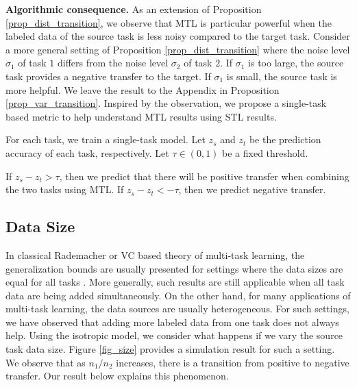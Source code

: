 \textbf{Algorithmic consequence.}
As an extension of Proposition \ref{prop_dist_transition}, we observe that MTL is particular powerful when the labeled data of the source task is less noisy compared to the target task.
Consider a more general setting of Proposition \ref{prop_dist_transition} where the noise level $\sigma_1$ of task $1$ differs from the noise level $\sigma_2$ of task $2$.
If $\sigma_1$ is too large, the source task provides a negative transfer to the target.
If $\sigma_1$ is small, the source task is more helpful.
We leave the result to the Appendix in Proposition \ref{prop_var_transition}.
Inspired by the observation, we propose a single-task based metric to help understand MTL results using STL results.
\squishlist
	\item For each task, we train a single-task model.
	Let $z_s$ and $z_t$ be the prediction accuracy of each task, respectively.
	Let $\tau\in(0, 1)$ be a fixed threshold.
	\item If $z_s - z_t > \tau$, then we predict that there will be positive transfer when combining the two tasks using MTL.
	If $z_s - z_t < -\tau$, then we predict negative transfer.
\squishend

\subsection{Data Size}\label{sec_data_size}

In classical Rademacher or VC based theory of multi-task learning, the generalization bounds are usually presented for settings where the data sizes are equal for all tasks \cite{B00,M06,MPR16}.
More generally, such results are still applicable when all task data are being added simultaneously.
On the other hand, for many applications of multi-task learning, the data sources are usually heterogeneous.
For such settings, we have observed that adding more labeled data from one task does not always help.
Using the isotropic model, we consider what happens if we vary the source task data size.
Figure \ref{fig_size} provides a simulation result for such a setting.
We observe that as $n_1 / n_2$ increases, there is a transition from positive to negative transfer.
Our result below explains this phenomenon.

